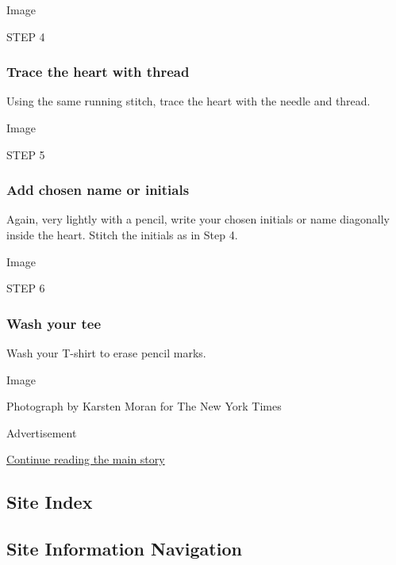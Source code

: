 Image

STEP 4

\hypertarget{trace-the-heart-with-thread}{%
\subsubsection{\texorpdfstring{\textbf{Trace the heart with
thread}}{Trace the heart with thread}}\label{trace-the-heart-with-thread}}

Using the same running stitch, trace the heart with the needle and
thread.

Image

STEP 5

\hypertarget{add-chosen-name-or-initials}{%
\subsubsection{\texorpdfstring{\textbf{Add chosen name or
initials}}{Add chosen name or initials}}\label{add-chosen-name-or-initials}}

Again, very lightly with a pencil, write your chosen initials or name
diagonally inside the heart. Stitch the initials as in Step 4.

Image

STEP 6

\hypertarget{wash-your-tee}{%
\subsubsection{\texorpdfstring{\textbf{Wash your
tee}}{Wash your tee}}\label{wash-your-tee}}

Wash your T-shirt to erase pencil marks.

Image

Photograph by Karsten Moran for The New York Times

Advertisement

\protect\hyperlink{after-bottom}{Continue reading the main story}

\hypertarget{site-index}{%
\subsection{Site Index}\label{site-index}}

\hypertarget{site-information-navigation}{%
\subsection{Site Information
Navigation}\label{site-information-navigation}}

